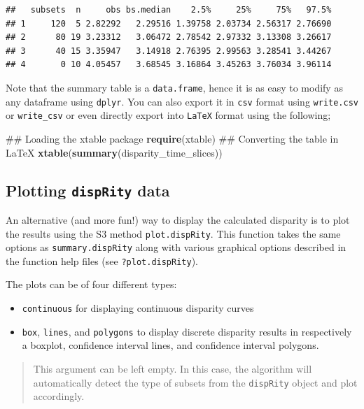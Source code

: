 \documentclass[]{book}
\newenvironment{Shaded}{\begin{snugshade}}{\end{snugshade}}
\newcommand{\KeywordTok}[1]{\textcolor[rgb]{0.13,0.29,0.53}{\textbf{#1}}}
\newcommand{\NormalTok}[1]{#1}
\providecommand{\tightlist}{%
  \setlength{\itemsep}{0pt}\setlength{\parskip}{0pt}}
\theoremstyle{definition}
\theoremstyle{definition}
\theoremstyle{remark}
\begin{document}
\begin{verbatim}
##   subsets  n     obs bs.median    2.5%     25%     75%   97.5%
## 1     120  5 2.82292   2.29516 1.39758 2.03734 2.56317 2.76690
## 2      80 19 3.23312   3.06472 2.78542 2.97332 3.13308 3.26617
## 3      40 15 3.35947   3.14918 2.76395 2.99563 3.28541 3.44267
## 4       0 10 4.05457   3.68545 3.16864 3.45263 3.76034 3.96114
\end{verbatim}

Note that the summary table is a \texttt{data.frame}, hence it is as
easy to modify as any dataframe using \texttt{dplyr}. You can also
export it in \texttt{csv} format using \texttt{write.csv} or
\texttt{write\_csv} or even directly export into \texttt{LaTeX} format
using the following;

\begin{Shaded}
\begin{Highlighting}[]
\NormalTok{## Loading the xtable package}
\KeywordTok{require}\NormalTok{(xtable)}
\NormalTok{## Converting the table in LaTeX}
\KeywordTok{xtable}\NormalTok{(}\KeywordTok{summary}\NormalTok{(disparity_time_slices))}
\end{Highlighting}
\end{Shaded}

\subsection{\texorpdfstring{Plotting \texttt{dispRity}
data}{Plotting dispRity data}}\label{plotting-disprity-data}

An alternative (and more fun!) way to display the calculated disparity
is to plot the results using the S3 method \texttt{plot.dispRity}. This
function takes the same options as \texttt{summary.dispRity} along with
various graphical options described in the function help files (see
\texttt{?plot.dispRity}).

The plots can be of four different types:

\begin{itemize}
\tightlist
\item
  \texttt{continuous} for displaying continuous disparity curves
\item
  \texttt{box}, \texttt{lines}, and \texttt{polygons} to display
  discrete disparity results in respectively a boxplot, confidence
  interval lines, and confidence interval polygons.
\end{itemize}

\begin{quote}
This argument can be left empty. In this case, the algorithm will
automatically detect the type of subsets from the \texttt{dispRity}
object and plot accordingly.
\end{quote}
\end{document}
